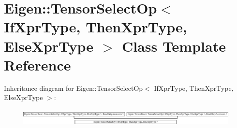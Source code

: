 \hypertarget{class_eigen_1_1_tensor_select_op}{}\section{Eigen\+:\+:Tensor\+Select\+Op$<$ If\+Xpr\+Type, Then\+Xpr\+Type, Else\+Xpr\+Type $>$ Class Template Reference}
\label{class_eigen_1_1_tensor_select_op}
Inheritance diagram for Eigen\+:\+:Tensor\+Select\+Op$<$ If\+Xpr\+Type, Then\+Xpr\+Type, Else\+Xpr\+Type $>$\+:\begin{figure}[H]
\begin{center}
\leavevmode
\includegraphics[height=0.913540cm]{class_eigen_1_1_tensor_select_op}
\end{center}
\end{figure}
